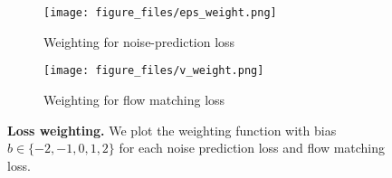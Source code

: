 \begin{figure}[t]
    \centering
    \begin{subfigure}[t]{0.35\columnwidth}
        \texttt{[image: figure\_files/eps\_weight.png]}
        \caption{Weighting for noise-prediction loss}
        \label{fig:eps_weight}
    \end{subfigure}
    \begin{subfigure}[t]{0.35\columnwidth}
        \centering\small
        \texttt{[image: figure\_files/v\_weight.png]}
        \caption{Weighting for flow matching loss}
        \label{fig:v_weight}
    \end{subfigure}
    \caption{\textbf{Loss weighting.} We plot the weighting function with bias $b\in \{-2, -1, 0, 1, 2\}$ for each noise prediction loss and flow matching loss.} 
    \label{fig:loss_weight}
    \vspace{-5pt}
\end{figure}